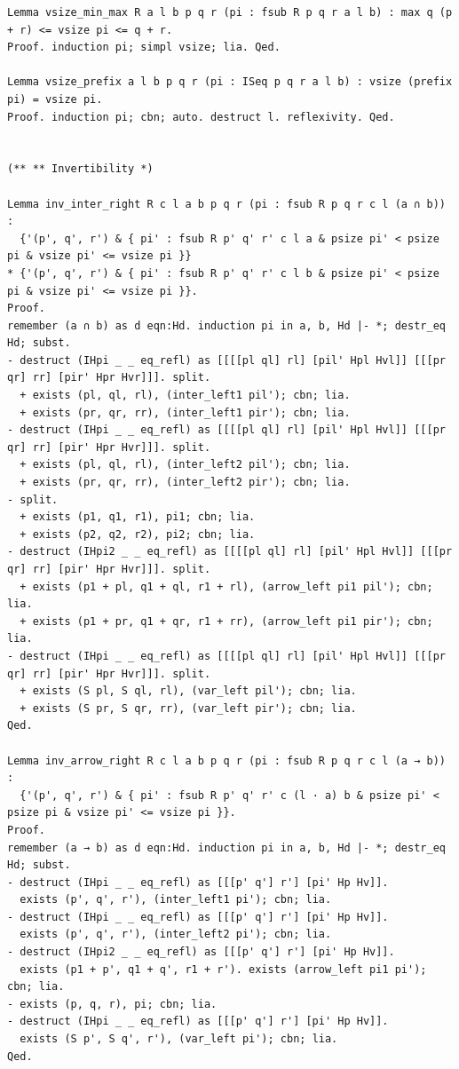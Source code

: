 \documentclass[10pt,a4paper]{article}
\begin{document}
\begin{lstlisting}
Lemma vsize_min_max R a l b p q r (pi : fsub R p q r a l b) : max q (p + r) <= vsize pi <= q + r.
Proof. induction pi; simpl vsize; lia. Qed.

Lemma vsize_prefix a l b p q r (pi : ISeq p q r a l b) : vsize (prefix pi) = vsize pi.
Proof. induction pi; cbn; auto. destruct l. reflexivity. Qed.


(** ** Invertibility *)

Lemma inv_inter_right R c l a b p q r (pi : fsub R p q r c l (a ∩ b)) :
  {'(p', q', r') & { pi' : fsub R p' q' r' c l a & psize pi' < psize pi & vsize pi' <= vsize pi }}
* {'(p', q', r') & { pi' : fsub R p' q' r' c l b & psize pi' < psize pi & vsize pi' <= vsize pi }}.
Proof.
remember (a ∩ b) as d eqn:Hd. induction pi in a, b, Hd |- *; destr_eq Hd; subst.
- destruct (IHpi _ _ eq_refl) as [[[[pl ql] rl] [pil' Hpl Hvl]] [[[pr qr] rr] [pir' Hpr Hvr]]]. split.
  + exists (pl, ql, rl), (inter_left1 pil'); cbn; lia.
  + exists (pr, qr, rr), (inter_left1 pir'); cbn; lia.
- destruct (IHpi _ _ eq_refl) as [[[[pl ql] rl] [pil' Hpl Hvl]] [[[pr qr] rr] [pir' Hpr Hvr]]]. split.
  + exists (pl, ql, rl), (inter_left2 pil'); cbn; lia.
  + exists (pr, qr, rr), (inter_left2 pir'); cbn; lia.
- split.
  + exists (p1, q1, r1), pi1; cbn; lia.
  + exists (p2, q2, r2), pi2; cbn; lia.
- destruct (IHpi2 _ _ eq_refl) as [[[[pl ql] rl] [pil' Hpl Hvl]] [[[pr qr] rr] [pir' Hpr Hvr]]]. split.
  + exists (p1 + pl, q1 + ql, r1 + rl), (arrow_left pi1 pil'); cbn; lia.
  + exists (p1 + pr, q1 + qr, r1 + rr), (arrow_left pi1 pir'); cbn; lia.
- destruct (IHpi _ _ eq_refl) as [[[[pl ql] rl] [pil' Hpl Hvl]] [[[pr qr] rr] [pir' Hpr Hvr]]]. split.
  + exists (S pl, S ql, rl), (var_left pil'); cbn; lia.
  + exists (S pr, S qr, rr), (var_left pir'); cbn; lia.
Qed.

Lemma inv_arrow_right R c l a b p q r (pi : fsub R p q r c l (a → b)) :
  {'(p', q', r') & { pi' : fsub R p' q' r' c (l · a) b & psize pi' < psize pi & vsize pi' <= vsize pi }}.
Proof.
remember (a → b) as d eqn:Hd. induction pi in a, b, Hd |- *; destr_eq Hd; subst.
- destruct (IHpi _ _ eq_refl) as [[[p' q'] r'] [pi' Hp Hv]].
  exists (p', q', r'), (inter_left1 pi'); cbn; lia.
- destruct (IHpi _ _ eq_refl) as [[[p' q'] r'] [pi' Hp Hv]].
  exists (p', q', r'), (inter_left2 pi'); cbn; lia.
- destruct (IHpi2 _ _ eq_refl) as [[[p' q'] r'] [pi' Hp Hv]].
  exists (p1 + p', q1 + q', r1 + r'). exists (arrow_left pi1 pi'); cbn; lia.
- exists (p, q, r), pi; cbn; lia.
- destruct (IHpi _ _ eq_refl) as [[[p' q'] r'] [pi' Hp Hv]].
  exists (S p', S q', r'), (var_left pi'); cbn; lia.
Qed.


\end{lstlisting}
\end{document}

